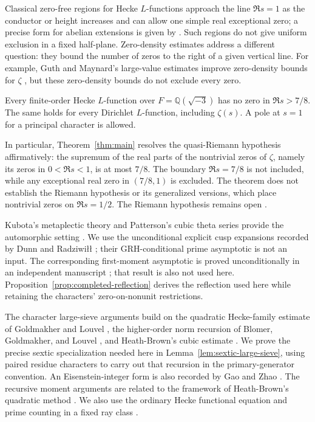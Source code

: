 Classical zero-free regions for Hecke $L$-functions approach the line
$\Re s=1$ as the conductor or height increases and can allow one
simple real exceptional zero; a precise form for abelian extensions is given
by \cite[Theorem 3.1]{TZ}. Such regions do not give uniform exclusion in
a fixed half-plane. Zero-density estimates address a different question:
they bound the number of zeros to the right of a given vertical line.
For example, Guth and Maynard's large-value estimates improve zero-density
bounds for $\zeta$ \cite[Theorem 1.2]{GM}, but these zero-density bounds
do not exclude every zero.

\begin{theorem}\label{thm:main}
Every finite-order Hecke $L$-function over
$F=\mathbb Q(\sqrt{-3})$ has no zero in $\Re s>7/8$.
The same holds for every Dirichlet $L$-function, including $\zeta(s)$.
A pole at $s=1$ for a principal character is allowed.
\end{theorem}

In particular, Theorem~\ref{thm:main} resolves the quasi-Riemann
hypothesis affirmatively: the supremum of the real parts of the
nontrivial zeros of $\zeta$, namely its zeros in $0<\Re s<1$, is at most
$7/8$. The boundary $\Re s=7/8$ is not included, while any exceptional
real zero in $(7/8,1)$ is excluded. The theorem does not establish the
Riemann hypothesis or its generalized versions, which place nontrivial
zeros on $\Re s=1/2$. The Riemann hypothesis remains open \cite{Clay}.

Kubota's metaplectic theory and Patterson's cubic theta series provide
the automorphic setting \cite{Kubota,Patterson}. We use the unconditional
explicit cusp expansions recorded by Dunn and Radziwi\l\l{}
\cite[Section 5 and Appendix A]{DR}; their GRH-conditional prime asymptotic
is not an input. The corresponding first-moment asymptotic is proved
unconditionally in an independent manuscript
\cite[Theorem~1.1]{OpenAICubicFirstMoment}; that result is also not used
here. Proposition~\ref{prop:completed-reflection} derives the
reflection used here while retaining the characters' zero-on-nonunit
restrictions.

The character large-sieve arguments build on the quadratic Hecke-family
estimate of Goldmakher and Louvel \cite[Definition 1 and Theorem 1.1]{GL},
the higher-order norm recursion of Blomer, Goldmakher, and Louvel
\cite[Theorem 1.3 and Section 3]{BGL}, and Heath-Brown's cubic estimate
\cite[Theorem 2]{HB}. We prove the precise sextic specialization needed
here in Lemma~\ref{lem:sextic-large-sieve}, using paired residue characters
to carry out that recursion in the primary-generator convention. An
Eisenstein-integer form is also recorded by Gao and Zhao
\cite[Lemma 2.9]{GZSextic}. The recursive
moment arguments are related to the framework of Heath-Brown's quadratic
method \cite[Section 2]{HBQuadratic}. We also use the ordinary Hecke
functional equation \cite[Equation (1.1)]{GZ} and prime counting in a
fixed ray class \cite[Theorem 1.1]{TZ}.

